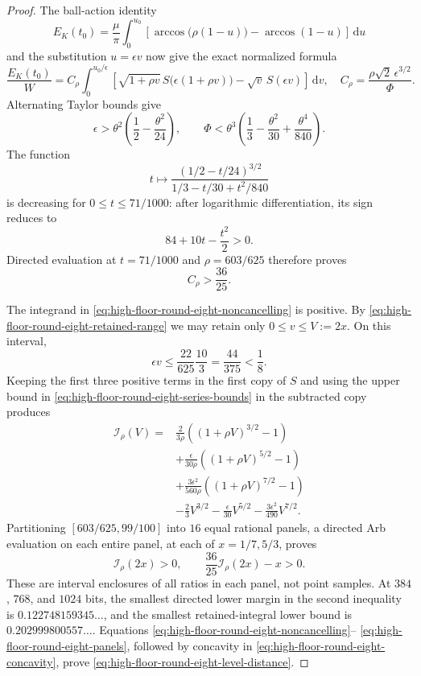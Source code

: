 \documentclass[11pt]{article}
\theoremstyle{remark}
\newcommand{\dd}{\,\mathrm d}
\begin{document}
\begin{proof}
The ball-action identity
\[
 E_K(t_0)=\frac{\mu}{\pi}\int_0^{u_0}
 \left[
 \arccos\bigl(\rho(1-u)\bigr)-\arccos(1-u)
 \right]\dd u
\]
and the substitution $u=\epsilon v$ now give the exact normalized formula
\begin{equation}
 \frac{E_K(t_0)}W
 =C_\rho\int_0^{u_0/\epsilon}
 \left[
 \sqrt{1+\rho v}\,S\bigl(\epsilon(1+\rho v)\bigr)
 -\sqrt v\,S(\epsilon v)
 \right]\dd v,
 \quad
 C_\rho=\frac{\rho\sqrt2\,\epsilon^{3/2}}{\Phi}.
 \label{eq:high-floor-round-eight-noncancelling}
\end{equation}
Alternating Taylor bounds give
\[
 \epsilon>\theta^2\left(\frac12-\frac{\theta^2}{24}\right),
 \qquad
 \Phi<\theta^3\left(
 \frac13-\frac{\theta^2}{30}+\frac{\theta^4}{840}
 \right).
\]
The function
\[
 t\longmapsto
 \frac{(1/2-t/24)^{3/2}}{1/3-t/30+t^2/840}
\]
is decreasing for $0\leq t\leq71/1000$: after logarithmic
differentiation, its sign reduces to
\[
 84+10t-\frac{t^2}{2}>0.
\]
Directed evaluation at $t=71/1000$ and $\rho=603/625$ therefore proves
\begin{equation}
 \boxed{C_\rho>\frac{36}{25}.}
 \label{eq:high-floor-round-eight-coefficient}
\end{equation}

The integrand in
\eqref{eq:high-floor-round-eight-noncancelling} is positive.  By
\eqref{eq:high-floor-round-eight-retained-range} we may retain only
$0\leq v\leq V:=2x$.  On this interval,
\[
 \epsilon v\leq\frac{22}{625}\frac{10}{3}
 =\frac{44}{375}<\frac18.
\]
Keeping the first three positive terms in the first copy of $S$ and using
the upper bound in
\eqref{eq:high-floor-round-eight-series-bounds} in the subtracted copy
produces
\begin{equation}
\begin{aligned}
 \mathcal I_\rho(V)
={}&\frac{2}{3\rho}
 \left((1+\rho V)^{3/2}-1\right)\\
&+\frac{\epsilon}{30\rho}
 \left((1+\rho V)^{5/2}-1\right)\\
&+\frac{3\epsilon^2}{560\rho}
 \left((1+\rho V)^{7/2}-1\right)\\
&-\frac23V^{3/2}-\frac{\epsilon}{30}V^{5/2}
 -\frac{3\epsilon^2}{490}V^{7/2}.
\end{aligned}
 \label{eq:high-floor-round-eight-integral}
\end{equation}
Partitioning
$[603/625,99/100]$ into $16$ equal rational panels, a directed Arb
evaluation on each entire panel, at each of $x=1/7,5/3$, proves
\begin{equation}
 \mathcal I_\rho(2x)>0,\qquad
 \frac{36}{25}\mathcal I_\rho(2x)-x>0.
 \label{eq:high-floor-round-eight-panels}
\end{equation}
These are interval enclosures of all ratios in each panel, not point
samples.  At $384$, $768$, and $1024$ bits, the smallest directed lower
margin in the second inequality is $0.122748159345\ldots$, and the
smallest retained-integral lower bound is $0.202999800557\ldots$.
Equations \eqref{eq:high-floor-round-eight-noncancelling}--%
\eqref{eq:high-floor-round-eight-panels}, followed by concavity in
\eqref{eq:high-floor-round-eight-concavity}, prove
\eqref{eq:high-floor-round-eight-level-distance}.


\end{proof}
\end{document}
